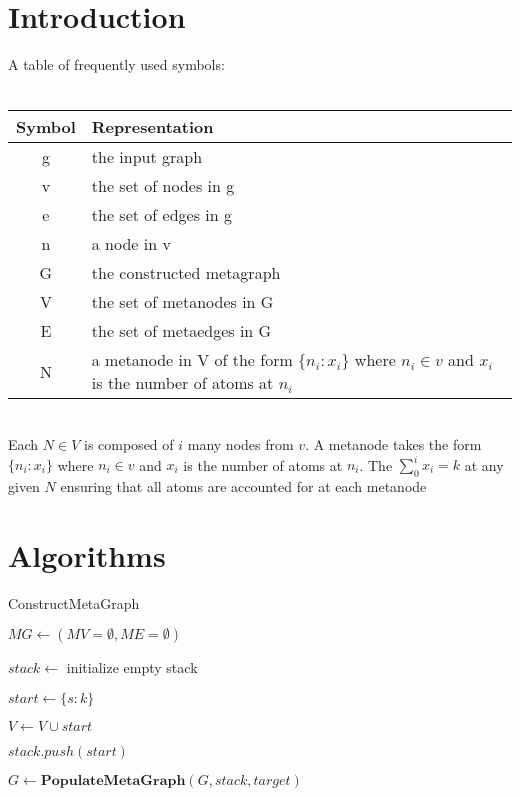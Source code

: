 \documentclass{article}
\begin{document}
    \section{Introduction}
    \label{sec:Introduction}
        A table of frequently used symbols: \\ \\
        \begin{tabular}{cl}
            \textbf{Symbol} & \textbf{Representation} \\
            \hline
            g & the input graph \\
            v & the set of nodes in g \\
            e & the set of edges in g \\
            n & a node in v \\
            G & the constructed metagraph \\
            V & the set of metanodes in G \\
            E & the set of metaedges in G \\
            N & a metanode in V of the form $\{n_i:x_i\}$ where $n_i \in v$ and
            $x_i$ is the number of atoms at $n_i$\\
            \hline
        \end{tabular} \\

        Each $N \in V$ is composed of $i$ many nodes from $v$. A
        metanode takes the form $\{n_i:x_i\}$ where $n_i \in v$ and $x_i$ is
        the number of atoms at $n_i$. The $\sum_0^i x_i = k$ at any given $N$
        ensuring that all atoms are accounted for at each metanode

    \section{Algorithms}
    \label{sec:Algorithms}

        \begin{algorithm}
            \caption{ConstructMetaGraph}

            $MG \gets (MV = \emptyset, ME = \emptyset)$ 

            $stack \gets$ initialize empty stack\;

            $start \gets \{s:k\}$ 

            $V \gets V \cup start$ 

            $stack.push(start)$ 

            $G \gets \textbf{PopulateMetaGraph}(G, stack, target)$ 

        \end{algorithm}
\end{document}
